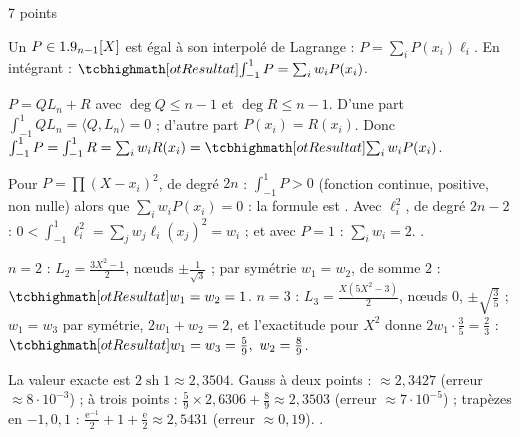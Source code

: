 \begin{corrigeEval}{7 points}{}
\begin{questions}[start=7]
  \item Un $P\in1.9_{n-1}[X]$ est égal à son interpolé de Lagrange :
    $P=\sum_iP(x_i)\ell_i$. En intégrant :
    $\res{\int_{-1}^{1}P=\sum_iw_iP(x_i)}$. \pts{1 pt}
  \item $P=QL_n+R$ avec $\deg Q\leqslant n-1$ et $\deg R\leqslant n-1$.
    D'une part $\int_{-1}^{1}QL_n=\langle Q,L_n\rangle=0$ ; d'autre part
    $P(x_i)=R(x_i)$. Donc
    $\int_{-1}^{1}P=\int_{-1}^{1}R=\sum_iw_iR(x_i)=\res{\sum_iw_iP(x_i)}$.
  \item Pour $P=\prod(X-x_i)^{2}$, de degré $2n$ : $\int_{-1}^{1}P>0$
    (fonction continue, positive, non nulle) alors que
    $\sum_iw_iP(x_i)=0$ : la formule est .
    Avec $\ell_i^{2}$, de degré $2n-2$ :
    $0<\int_{-1}^{1}\ell_i^{2}=\sum_jw_j\ell_i(x_j)^{2}=w_i$ ; et avec $P=1$ :
    $\sum_iw_i=2$. .
  \item $n=2$ : $L_2=\frac{3X^{2}-1}{2}$, nœuds $\pm\frac{1}{\sqrt3}$ ; par
    symétrie $w_1=w_2$, de somme $2$ : $\res{w_1=w_2=1}$. $n=3$ :
    $L_3=\frac{X(5X^{2}-3)}{2}$, nœuds $0$, $\pm\sqrt{\frac35}$ ; $w_1=w_3$
    par symétrie, $2w_1+w_2=2$, et l'exactitude pour $X^{2}$ donne
    $2w_1\cdot\frac35=\frac23$ : $\res{w_1=w_3=\frac59,\ w_2=\frac89}$.
  \item La valeur exacte est $2\operatorname{sh}1\approx2{,}3504$. Gauss à
    deux points : $\approx2{,}3427$ (erreur $\approx8\cdot10^{-3}$) ; à trois
    points : $\frac59\times2{,}6306+\frac89\approx2{,}3503$ (erreur
    $\approx7\cdot10^{-5}$) ; trapèzes en $-1,0,1$ :
    $\frac{\mathrm{e}^{-1}}{2}+1+\frac{\mathrm{e}}{2}\approx2{,}5431$ (erreur
    $\approx0{,}19$). . \pts{1 pt}
\end{questions}
\begin{center}\begin{minipage}{\linewidth}\centering
{}
\end{minipage}
\end{center}
\end{corrigeEval}
